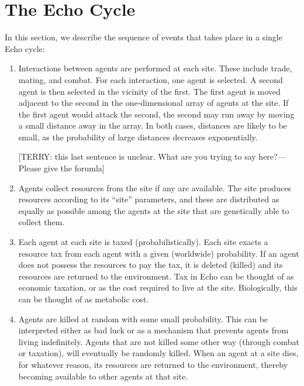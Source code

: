\section{The Echo Cycle}
\label{echo-cycle}

%
%
In this section, we describe the sequence of events that takes place in
a single Echo cycle:
\begin{enumerate}
\item Interactions between agents are performed at each site.  These
  include trade, mating, and combat.  For each interaction, one agent
  is selected.  A second agent is then selected in the vicinity of the
  first.  The first agent is moved adjacent to the second in the
  one-dimensional array of agents at the site.  If the first agent
  would attack the second, the second may run away by moving a small
  distance away in the array.  In both cases, distances are likely to
  be small, as the probability of large distances decreases
  exponentially.

  [TERRY: this last sentence is unclear.  What are you
  trying to say here?---Please give the forumla]

\item Agents collect resources from the site if any are available.
  The site produces resources according to its ``site'' parameters,
  and these are distributed as equally as possible among the agents at
  the site that are genetically able to collect them.

\item Each agent at each site is taxed (probabilistically).  Each site
  exacts a resource tax from each agent with a given (worldwide)
  probability.  If an agent does not possess the resources to pay the
  tax, it is deleted (killed) and its resources are returned to the
  environment.  Tax in Echo can be thought of as economic taxation, or
  as the cost required to live at the site.  Biologically, this can be
  thought of as metabolic cost.

\item Agents are killed at random with some small probability.  This
  can be interpreted either as bad luck or as a mechanism that
  prevents agents from living indefinitely.  Agents that are not
  killed some other way (through combat or taxation), will eventually
  be randomly killed.  When an agent at a site dies, for whatever
  reason, its resources are returned to the environment, thereby
  becoming available to other agents at that site.


\end{enumerate}
